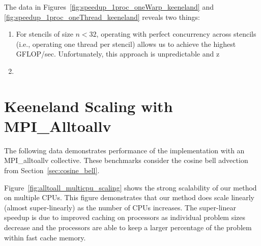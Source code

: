 The data in Figures~\ref{fig:speedup_1proc_oneWarp_keeneland} and \ref{fig:speedup_1proc_oneThread_keeneland} reveals two things: 
\begin{enumerate} 
\item For stencils of size $n < 32$, operating with perfect concurrency across stencils (i.e., operating one thread per stencil) allows us to achieve the highest GFLOP/sec. Unfortunately, this approach is unpredictable and z
\item 
\end{enumerate}


\section{Keeneland Scaling with MPI\_Alltoallv}

The following data demonstrates performance of the implementation with an MPI\_alltoallv collective. These benchmarks consider the cosine bell advection from Section~\ref{sec:cosine_bell}. 

Figure~\ref{fig:alltoall_multicpu_scaling} shows the strong scalability of our method on multiple CPUs. This figure demonstrates that our method does scale linearly (almost super-linearly) as the number of CPUs increases. 
The super-linear speedup is due to improved caching on processors as individual problem sizes decrease and the processors are able to keep a larger percentage of the problem within fast cache memory.

